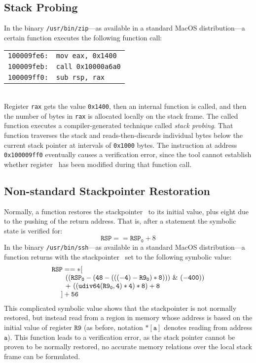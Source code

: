 \subsection{Stack Probing}
In the binary \texttt{/usr/bin/zip}---as available in a standard MacOS distribution---a certain function executes the following function call:
\\[1ex]
\hspace{3em}\begin{tabular}{ll}
  \texttt{100009fe6:} & \texttt{mov	eax, 0x1400}\\
  \texttt{100009feb:} & \texttt{call	0x10000a6a0}\\
  \texttt{100009ff0:} & \texttt{sub	rsp, rax}
\end{tabular}
\\[1ex]
Register \texttt{rax} gets the value \texttt{0x1400}, then an internal function is called, and then the number of bytes in \texttt{rax} is allocated locally on the stack frame.
The called function executes a compiler-generated technique called \emph{stack probing}.
That function traverses the stack and reads-then-discards individual bytes below the current stack pointer at intervals of \texttt{0x1000} bytes.
The instruction at address \texttt{0x100009ff0} eventually causes a verification error, since the tool cannot establish whether register \rax\ has been modified during that function call.

\subsection{Non-standard Stackpointer Restoration}
Normally, a function restores the stackpointer \rsp\ to its initial value, plus eight due to the pushing of the return address. That is, after a  statement the symbolic state is verified for:
\begin{equation*}
  \mathtt{RSP} == \mathtt{RSP_0} + 8
\end{equation*}
In the binary \texttt{/usr/bin/ssh}---as available in a standard MacOS distribution---a function returns with the stackpointer \rsp\ set to the following symbolic value:
\begin{equation*}
  \begin{array}{ll}
    \multicolumn{2}{l}{\mathtt{RSP == *[ }}\\
    & \mathtt{ ~~~((RSP_0 - (48 - (((-4) - R9_0) * 8))) ~\&~(-400))  }\\
    & \mathtt{ ~~~ +~((udiv64(R9_0,4) * 4) * 8) + 8}\\
    & \mathtt{ ~] + 56}\\
  \end{array}
\end{equation*}
This complicated symbolic value shows that the stackpointer is not normally restored, but instead read from a region in memory whose address is based on the initial value of register $\mathtt{R9}$ (as before, notation $\mathtt{*[a]}$ denotes reading from address $\mathtt{a}$).
This function leads to a verification error, as the stack pointer cannot be proven to be normally restored, no accurate memory relations over the local stack frame can be formulated.
